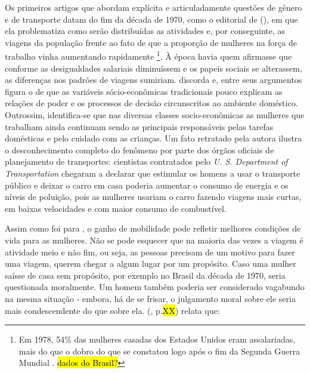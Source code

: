 Os primeiros artigos que abordam explícita e articuladamente questões de gênero e de transporte datam do fim da década de 1970, como o editorial de  (\citeyear{ROSENBLOOM1978}), em que ela problematiza como serão distribuídas as atividades e, por conseguinte, as viagens da população frente ao fato de que a proporção de mulheres na força de trabalho vinha aumentando rapidamente%
\footnote{Em 1978, 54\% das mulheres casadas dos Estados Unidos eram assalariadas, mais do que o dobro do que se constatou logo após o fim da Segunda Guerra Mundial \cite{ROSENBLOOM1978}.
\hl{dados do Brasil?}}. À época havia quem afirmasse que conforme as desigualdades salariais diminuíssem e os papeis sociais se alterassem, as diferenças nos padrões de viagens sumiriam.  discorda e, entre seus argumentos figura o de que as variáveis sócio-econômicas tradicionais pouco explicam as relações de poder e os processos de decisão circunscritos ao ambiente doméstico. Outrossim, identifica-se que nas diversas classes socio-econômicas as mulheres que trabalham ainda continuam sendo as principais responsáveis pelas tarefas domésticas e pelo cuidado com as crianças. Um fato retratado pela autora ilustra o desconhecimento completo do fenômeno por parte dos órgãos oficiais de planejamento de transportes: cientistas contratados pelo \emph{U. S. Department of Transportation} chegaram a declarar que estimular os homens a usar o transporte público e  deixar o carro em casa poderia aumentar o consumo de energia e os níveis de poluição, pois as mulheres usariam o carro fazendo viagens mais curtas, em baixas velocidades e com maior consumo de combustível.


Assim como foi para , o ganho de mobilidade pode refletir melhores condições de vida para as mulheres. Não se pode esquecer que na maioria das vezes a viagem é atividade meio e não fim, ou seja, as pessoas precisam de um motivo para fazer uma viagem, querem chegar a algum lugar por um propósito. Caso uma mulher saísse de casa sem propósito, por exemplo no Brasil da década de 1970, seria questionada moralmente. Um homem também poderia ser considerado vagabundo na mesma situação - embora, há de se frisar, o julgamento moral sobre ele seria mais condescendente do que sobre ela.  (\citeyear{DINCAO2012}, p.\hl{XX}) relata que: 

